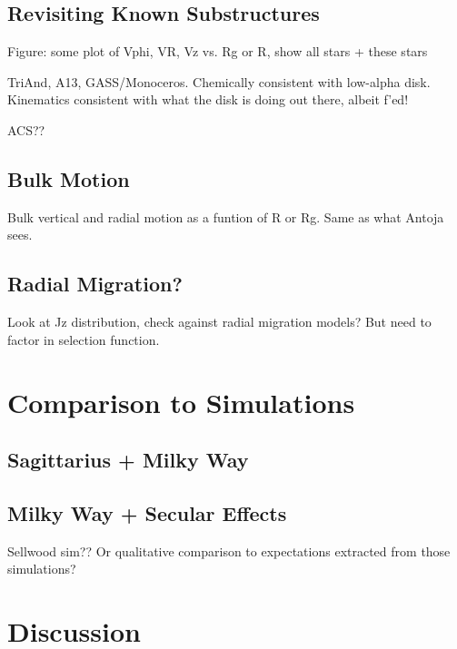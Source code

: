 \documentclass[modern]{aastex63}
\begin{document}
\subsection{Revisiting Known Substructures}
\label{sec:triandplus}

Figure: some plot of Vphi, VR, Vz vs. Rg or R, show all stars + these stars

TriAnd, A13, GASS/Monoceros. Chemically consistent with low-alpha disk. Kinematics consistent with what the disk is doing out there, albeit f'ed!

ACS??

\subsection{Bulk Motion}
\label{sec:bulkmotion}

Bulk vertical and radial motion as a funtion of R or Rg. Same as what Antoja sees.

\subsection{Radial Migration?}
\label{sec:radialmigration}

Look at Jz distribution, check against radial migration models? But need to factor in selection function.



\section{Comparison to Simulations}
\label{sec:sims}

\subsection{Sagittarius + Milky Way}
\label{sec:sag-only}

\subsection{Milky Way + Secular Effects}
\label{sec:mw-secular}

Sellwood sim?? Or qualitative comparison to expectations extracted from those simulations?


\section{Discussion}
\label{sec:discussion}
\end{document}
